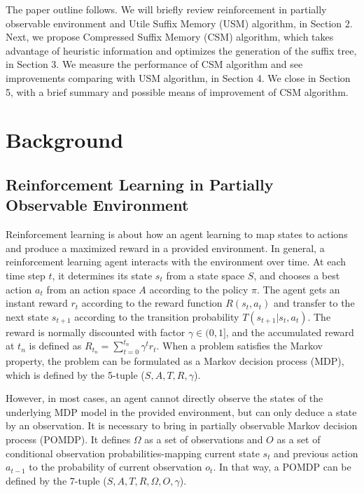 \documentclass[conference]{IEEEtran}
\begin{document}
	The paper outline follows. We will briefly review reinforcement in partially observable
	environment and Utile Suffix Memory (USM) algorithm, in Section 2.
	Next, we propose Compressed Suffix Memory (CSM) algorithm, which takes advantage of
	heuristic information and optimizes the generation of the suffix tree, in Section 3.
	We measure the performance of CSM algorithm and see improvements comparing with USM algorithm, in Section 4.
	We close in Section 5, with a brief summary and possible means of improvement of CSM algorithm.
	
	\section{Background}
	
	\subsection{Reinforcement Learning in Partially Observable Environment}
	
	Reinforcement learning is about how an agent learning to map states to actions
	and produce a maximized reward in a provided environment. In general, a
	reinforcement learning agent interacts with the environment over time.
	At each time step $t$, it determines its state $s_t$ from a state space $S$,
	and chooses a best action $a_t$ from an action space $A$ according to the policy
	$\pi$. The agent gets an instant reward $r_t$ according to the reward function
	$R(s_t, a_t)$ and transfer to the next state $s_{t+1}$ according to the transition
	probability $T(s_{t+1}|s_t, a_t)$. The reward is normally discounted with factor
	$\gamma\in(0,1]$, and the   accumulated reward at $t_n$ is defined as
	$R_{t_n}=\sum_{t=0}^{t_n} \gamma^t r_t$. When a problem satisfies the Markov
	property, the problem can be formulated as a Markov decision process (MDP), which
	is defined by the 5-tuple ($S, A, T, R, \gamma$).
	
	However, in most cases, an agent cannot directly observe the states of the
	underlying MDP model in the provided environment, but can only deduce a state by an
	observation. It is necessary to bring in partially observable Markov decision
	process (POMDP). It defines $\Omega$ as a set of observations and $O$ as a set of
	conditional observation probabilities-mapping current state $s_t$ and
	previous action $a_{t-1}$ to the probability of current observation $o_t$. 
	In that way, a POMDP can be defined by the 7-tuple ($S, A, T, R, \Omega, O, \gamma$).
	
\end{document}
